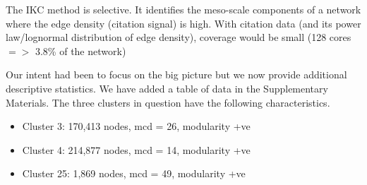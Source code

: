 \documentclass[11pt, oneside]{article}   	%
\begin{document}
The IKC method is selective. It identifies the meso-scale components of a network where the edge density (citation signal) is high. With citation data (and its power law/lognormal distribution of edge density), coverage would be small (128 cores $=>$ 3.8\% of the network) 

Our intent had been to focus on the big picture but we now provide additional descriptive statistics. We have added a table of data in the Supplementary Materials. The three clusters in question have the following characteristics. 

\clearpage

\begin{itemize}
\item Cluster 3: 170,413 nodes, mcd = 26, modularity +ve
\item Cluster 4: 214,877 nodes, mcd = 14, modularity +ve
\item Cluster 25: 1,869 nodes, mcd = 49, modularity +ve
\end{itemize}
\end{document}

